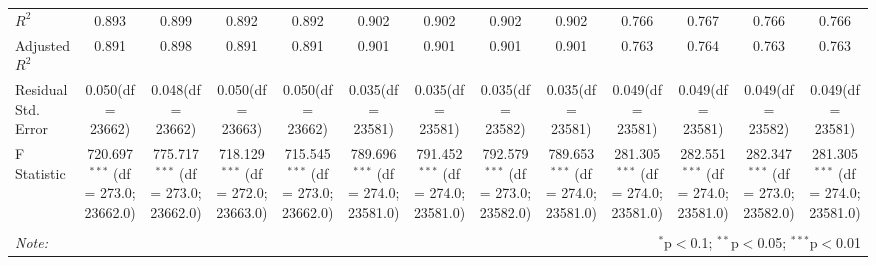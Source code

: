 \begin{table}[!htbp]
\begin{tabular}{@{\extracolsep{5pt}}lcccccccccccc}
 $R^2$ & 0.893 & 0.899 & 0.892 & 0.892 & 0.902 & 0.902 & 0.902 & 0.902 & 0.766 & 0.767 & 0.766 & 0.766 \\
 Adjusted $R^2$ & 0.891 & 0.898 & 0.891 & 0.891 & 0.901 & 0.901 & 0.901 & 0.901 & 0.763 & 0.764 & 0.763 & 0.763 \\
 Residual Std. Error & 0.050(df = 23662) & 0.048(df = 23662) & 0.050(df = 23663) & 0.050(df = 23662) & 0.035(df = 23581) & 0.035(df = 23581) & 0.035(df = 23582) & 0.035(df = 23581) & 0.049(df = 23581) & 0.049(df = 23581) & 0.049(df = 23582) & 0.049(df = 23581)  \\
 F Statistic & 720.697$^{***}$ (df = 273.0; 23662.0) & 775.717$^{***}$ (df = 273.0; 23662.0) & 718.129$^{***}$ (df = 272.0; 23663.0) & 715.545$^{***}$ (df = 273.0; 23662.0) & 789.696$^{***}$ (df = 274.0; 23581.0) & 791.452$^{***}$ (df = 274.0; 23581.0) & 792.579$^{***}$ (df = 273.0; 23582.0) & 789.653$^{***}$ (df = 274.0; 23581.0) & 281.305$^{***}$ (df = 274.0; 23581.0) & 282.551$^{***}$ (df = 274.0; 23581.0) & 282.347$^{***}$ (df = 273.0; 23582.0) & 281.305$^{***}$ (df = 274.0; 23581.0) \\
\hline
\hline \\[-1.8ex]
\textit{Note:} & \multicolumn{12}{r}{$^{*}$p$<$0.1; $^{**}$p$<$0.05; $^{***}$p$<$0.01} \\
\end{tabular}
\end{table}